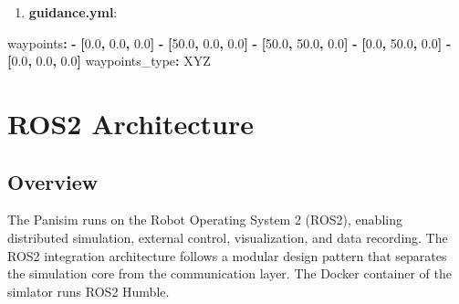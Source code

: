 \documentclass[
  letterpaper,
  DIV=11,
  numbers=noendperiod]{scrreprt}
\newenvironment{Shaded}{\begin{snugshade}}{\end{snugshade}}
\newcommand{\AttributeTok}[1]{\textcolor[rgb]{0.40,0.45,0.13}{#1}}
\newcommand{\FloatTok}[1]{\textcolor[rgb]{0.68,0.00,0.00}{#1}}
\newcommand{\FunctionTok}[1]{\textcolor[rgb]{0.28,0.35,0.67}{#1}}
\newcommand{\KeywordTok}[1]{\textcolor[rgb]{0.00,0.23,0.31}{\textbf{#1}}}
\providecommand{\tightlist}{%
  \setlength{\itemsep}{0pt}\setlength{\parskip}{0pt}}\usepackage{longtable,booktabs,array}
\begin{document}
\begin{enumerate}
\def\labelenumi{\arabic{enumi}.}
\setcounter{enumi}{8}
\tightlist
\item
  \textbf{guidance.yml}:
\end{enumerate}

\begin{Shaded}
\begin{Highlighting}[]
\FunctionTok{waypoints}\KeywordTok{:}
\AttributeTok{  }\KeywordTok{{-}}\AttributeTok{ }\KeywordTok{[}\FloatTok{0.0}\KeywordTok{,}\AttributeTok{ }\FloatTok{0.0}\KeywordTok{,}\AttributeTok{ }\FloatTok{0.0}\KeywordTok{]}
\AttributeTok{  }\KeywordTok{{-}}\AttributeTok{ }\KeywordTok{[}\FloatTok{50.0}\KeywordTok{,}\AttributeTok{ }\FloatTok{0.0}\KeywordTok{,}\AttributeTok{ }\FloatTok{0.0}\KeywordTok{]}
\AttributeTok{  }\KeywordTok{{-}}\AttributeTok{ }\KeywordTok{[}\FloatTok{50.0}\KeywordTok{,}\AttributeTok{ }\FloatTok{50.0}\KeywordTok{,}\AttributeTok{ }\FloatTok{0.0}\KeywordTok{]}
\AttributeTok{  }\KeywordTok{{-}}\AttributeTok{ }\KeywordTok{[}\FloatTok{0.0}\KeywordTok{,}\AttributeTok{ }\FloatTok{50.0}\KeywordTok{,}\AttributeTok{ }\FloatTok{0.0}\KeywordTok{]}
\AttributeTok{  }\KeywordTok{{-}}\AttributeTok{ }\KeywordTok{[}\FloatTok{0.0}\KeywordTok{,}\AttributeTok{ }\FloatTok{0.0}\KeywordTok{,}\AttributeTok{ }\FloatTok{0.0}\KeywordTok{]}
\FunctionTok{waypoints\_type}\KeywordTok{:}\AttributeTok{ XYZ}
\end{Highlighting}
\end{Shaded}


\chapter*{ROS2 Architecture}\label{ros2-architecture}


\section*{Overview}\label{overview-5}


The Panisim runs on the Robot Operating System 2 (ROS2), enabling
distributed simulation, external control, visualization, and data
recording. The ROS2 integration architecture follows a modular design
pattern that separates the simulation core from the communication layer.
The Docker container of the simlator runs ROS2 Humble.
\end{document}

